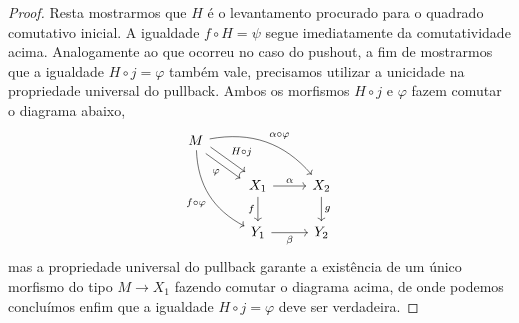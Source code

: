 \begin{proof}
  Resta mostrarmos que $H$ é o levantamento procurado para o quadrado comutativo inicial.
  A igualdade $f \circ H = \psi$ segue imediatamente da comutatividade acima.
  Analogamente ao que ocorreu no caso do pushout, a fim de mostrarmos que a igualdade $H \circ j = \varphi$ também vale, precisamos utilizar a unicidade na propriedade universal do pullback.
  Ambos os morfismos $H \circ j$ e $\varphi$ fazem comutar o diagrama abaixo,
  \begin{displaymath}
    \begin{tikzcd}
      M
      \arrow[rd, shift left=1.2, "H \circ j"]
      \arrow[rd, shift right=1.2, "\varphi" swap]
      \arrow[rrd, bend left=30, "\alpha \circ \varphi"]
      \arrow[rdd, bend right=30, "f \circ \varphi" swap]
      \\ & X_{1}
      \arrow[r, "\alpha"]
      \arrow[d, "f" swap]
      & X_{2}
      \arrow[d, "g"]
      \\ & Y_{1}
      \arrow[r, "\beta" swap]
      & Y_{2}
    \end{tikzcd}
  \end{displaymath}
  mas a propriedade universal do pullback garante a existência de um único morfismo do tipo $M \to X_{1}$ fazendo comutar o diagrama acima, de onde podemos concluímos enfim que a igualdade $H \circ j = \varphi$ deve ser verdadeira.
\end{proof}



